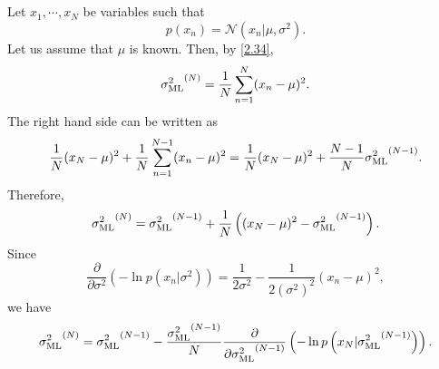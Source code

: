 \subsection{}
\label{2.36}
Let $x_1, \cdots, x_N$ be variables such that
%
\begin{equation}
p(x_n)
=
\mathcal{N}
\left(
	x_n
	|
	\mu,
	\sigma ^ 2
\right).
\end{equation}
%
Let us assume that $\mu$ is known.
Then, by \ref{2.34},
%
\begin{equation}
{\sigma_{\rm ML} ^ 2} ^ {(N)}
=
\frac{1}{N}
\sum_{n = 1}^{N}
(x_n - \mu) ^ 2.
\end{equation}
%
The right hand side can be written as
%
\begin{equation}
\frac{1}{N}
( x_N - \mu) ^ 2
+
\frac{1}{N}
\sum_{n = 1}^{N - 1}
(x_n - \mu) ^ 2
=
\frac{1}{N}
( x_N - \mu) ^ 2
+
\frac{N - 1}{N}
{\sigma_{\rm ML} ^ 2} ^ {(N - 1)}.
\end{equation}
%
Therefore,
%
\begin{equation}
{\sigma_{\rm ML} ^ 2} ^ {(N)}
=
{\sigma_{\rm ML} ^ 2} ^ {(N - 1)}
+
\frac{1}{N}
\left(
	(x_N - \mu) ^ 2
	-
	{\sigma_{\rm ML} ^ 2} ^ {(N - 1)}
\right).
\end{equation}
%
Since
%
\begin{equation}
\frac{\partial}{\partial \sigma ^ 2} 
\left(
	- 
	\ln p
	\left(
		x_n 
		| 
		\sigma ^ 2
	\right)
\right)
=
\frac{1}{2 \sigma ^ 2}
-
\frac{1}{2 \left( \sigma ^ 2 \right) ^ 2} 
(x_n - \mu) ^ 2,
\end{equation}
%
we have
%
\begin{equation}
{\sigma_{\rm ML} ^ 2} ^ {(N)}
=
{\sigma_{\rm ML} ^ 2} ^ {(N - 1)}
-
\frac{{\sigma_{\rm ML} ^ 2} ^ {(N - 1)}}{N}
\frac{\partial}{\partial {\sigma_{\rm ML} ^ 2} ^ {(N - 1)}} 
\left(
	- \ln p
	\left(
		x_N 
		| 
		{\sigma_{\rm ML} ^ 2} ^ {(N - 1)}
	\right)
\right).
\end{equation}
%


